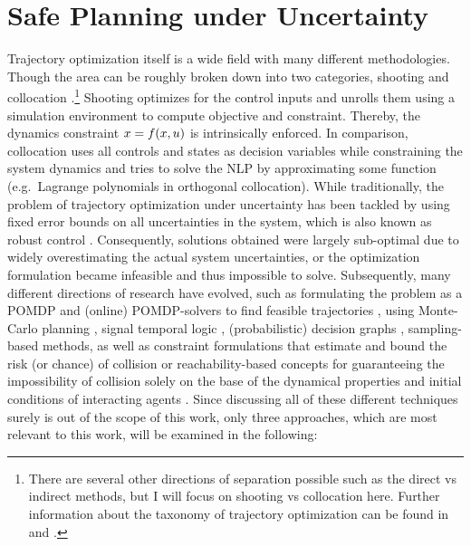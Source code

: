 \section{Safe Planning under Uncertainty}
\label{text:related/uncertainty}
Trajectory optimization itself is a wide field with many different methodologies. Though the area can be roughly broken down into two categories, shooting and collocation \cite{Kelly2017}.\footnote{There are several other directions of separation possible such as the direct vs indirect methods, but I will focus on shooting vs collocation here. Further information about the taxonomy of trajectory optimization can be found in \cite{Kelly2017}  and \cite{Chai2020}.} Shooting optimizes for the control inputs and unrolls them using a simulation environment to compute objective and constraint. Thereby, the dynamics constraint $x = f(x, u)$ is intrinsically enforced. In comparison, collocation uses all controls and states as decision variables while constraining the system dynamics and tries to solve the \ac{NLP} by approximating some function (e.g.\ Lagrange polynomials in orthogonal collocation).
\newline
While traditionally, the problem of trajectory optimization under uncertainty has been tackled by using fixed error bounds on all uncertainties in the system, which is also known as robust control \cite{Bemporad1999}. Consequently, solutions obtained were largely sub-optimal due to widely overestimating the actual system uncertainties, or the optimization formulation became infeasible and thus impossible to solve. Subsequently, many different directions of research have evolved, such as formulating the problem as a \ac{POMDP} and (online) \ac{POMDP}-solvers to find feasible trajectories \cite{Chen2016}, using Monte-Carlo planning \cite{Janson2015} \cite{Silver2010}, signal temporal logic \cite{Sadigh2016}, (probabilistic) decision graphs \cite{Koenig1994}, sampling-based methods, as well as constraint formulations that estimate and bound the risk (or chance) of collision \cite{Ono2015}\cite{Lew2019}\cite{Chow2015a}\cite{Chow2013}\cite{Ono2012}\cite{Ludersa}\cite{Luders2011}\cite{Otte2014} or reachability-based concepts for guaranteeing the impossibility of collision solely on the base of the dynamical properties and initial conditions of interacting agents \cite{Leung2020}\cite{Dhinakaran2017}\cite{Margellos2009}\cite{Chen2017b} \cite{Althoff2009}\cite{Althoff2010}. Since discussing all of these different techniques surely is out of the scope of this work, only three approaches, which are most relevant to this work, will be examined in the following:

